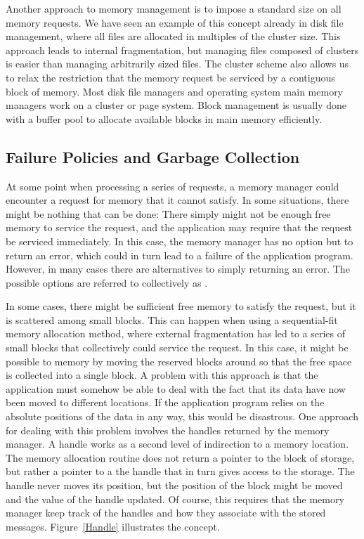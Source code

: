 Another approach to memory management is to impose a standard size on
all memory requests.
We have seen an example of this concept already in disk file
management, where all files are allocated in multiples of the
cluster size.
This approach leads to internal fragmentation,
but managing files composed of clusters is easier than managing
arbitrarily sized files.
The cluster scheme also allows us to relax the restriction that the
memory request be serviced by a contiguous block of memory.
Most disk file managers and
operating system main memory managers
work on a cluster or page system.
Block management is usually done with a buffer pool
to allocate available blocks in main memory efficiently.

\subsection{Failure Policies and Garbage Collection}
\label{Failure}

At some point when processing a series of requests, a memory manager
could encounter a request for memory that it cannot satisfy.
In some situations, there might be nothing that can be done:
There simply might not be enough free memory to service the request,
and the application may require that the request be serviced
immediately.
In this case, the memory manager has no option but to return an
error, which could in turn lead to a failure of the application
program.
However, in many cases there are alternatives to simply returning an
error.
The possible options are referred to collectively as
.

In some cases, there might be sufficient free memory to satisfy the
request, but it is scattered among small blocks.
This can happen when using a sequential-fit memory allocation method,
where external fragmentation
has led to a series of small blocks
that collectively could service the request.
In this case, it might be possible to  memory by moving
the reserved blocks around so that the free space is collected into a
single block.
A problem with this approach is that the application must somehow be
able to deal with the fact that its data have now been moved
to different locations.
If the application program relies on the absolute positions of the
data in any way, this would be disastrous.
One approach for dealing with this problem involves the handles
returned by the memory manager.
A handle works as a second level of indirection to a memory location.
The memory allocation routine does not return a pointer to the block
of storage, but rather a pointer to a the handle that in turn gives
access to the storage.
The handle never moves its position, but the position of the block
might be moved and the value of the handle updated.
Of course, this requires that the memory manager keep track of the
handles and how they associate with the stored messages.
Figure~\ref{Handle} illustrates the concept.

